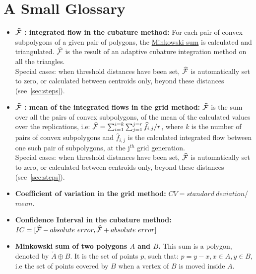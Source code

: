 \documentclass[a4paper,twoside,openright]{report}
\newcommand{\A}{{\cal F}}
\begin{document}
\part{A Small Glossary}
\label{glossary}
\begin{itemize}

\item\textbf{\hypertarget{cubmean}{$\widehat{\A}$ : integrated flow} in the cubature  method:}
\newline
For each
pair of convex subpolygons of a given pair
of polygons, the \hyperlink{mink}{Minkowski sum}
is calculated and triangulated.
$\widehat{\A}$ is the result of an adaptive cubature  integration
method
 on all the triangles.\\
Special cases:
when threshold distances have been set,
 $\widehat{\A}$ is automatically set to zero,
or calculated between centroids only,
beyond these distances (see~\ref{sec:steps}).


\item\textbf{\hypertarget{gridmean}{$\widehat{\A}$ : mean of the integrated flows} in the grid method:}
\newline
$\widehat{\A}$ is the sum over all the pairs of
convex subpolygons, 
of the mean of the calculated values over the replications, i.e:
$\widehat{\A} = \sum_{i=1}^{i=k}\sum_{j=1}^{j=r}\widehat{f}_{i,j}/r$,
where $k$ is the number of pairs of convex subpolygons and
$\widehat{f}_{i,j}$ is the calculated integrated flow 
between one such pair of subpolygons,
at the j$^{th}$ grid generation.\\
Special cases:
when threshold distances have been set,
$\widehat{\A}$ is automatically set to zero,
or calculated between centroids only,
beyond these distances (see~\ref{sec:steps}).



\item
\textbf{\hypertarget{gridcoefvar}{Coefficient of variation}  in the grid method:}
\newline
$CV = $\hyperlink{gridet}{$standard\ deviation$}/\hyperlink{gridmean}{$mean$}.

\item\textbf{\hypertarget{cubic}{Confidence Interval} in the cubature method:}
\newline
$IC = [\widehat{\A} - absolute\ error, \widehat{\A} + absolute\
error]$

\item\textbf{\hypertarget{mink}{ Minkowski sum of two polygons $A$ and $B$.}}
\newline
This sum is a polygon, denoted by $\check{A}\oplus B$.
It is the set of points $p$, such that:
$p= y-x, x \in A, y\in B$, i.e the set of points covered by $B$
when a vertex of $B$ is moved inside $A$.


\end{itemize}
\end{document}
